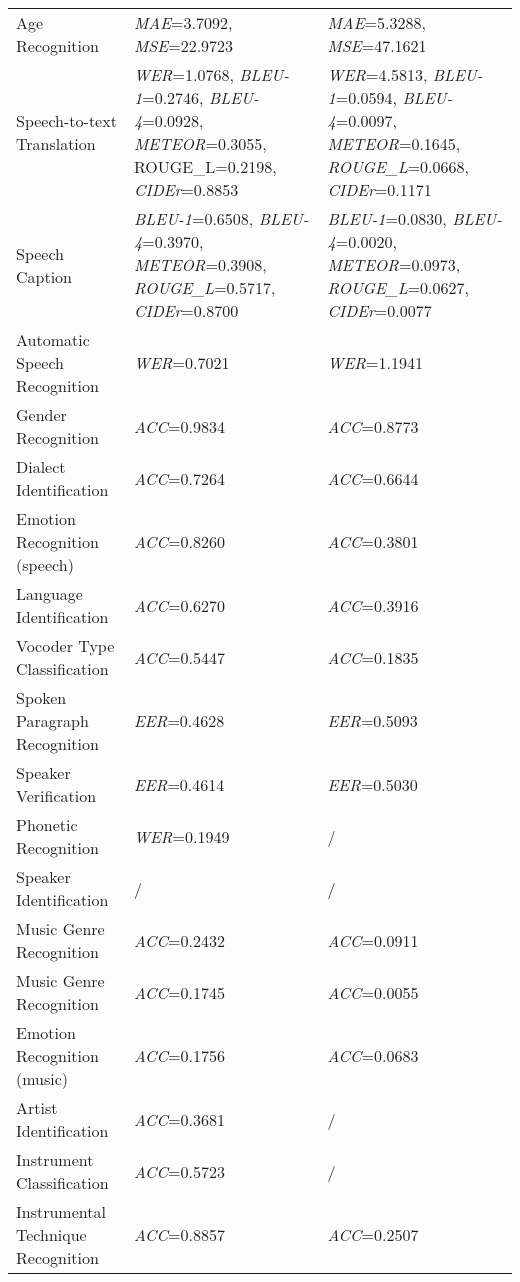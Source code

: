 \begin{longtable}[hbtp]{p{4.6cm}<{\raggedright}p{4.5cm}<{\raggedright}p{4.5cm}<{\raggedright}}
    Age Recognition & \textit{MAE}=3.7092, \textit{MSE}=22.9723 & \textit{MAE}=5.3288, \textit{MSE}=47.1621 \\  %
    Speech-to-text Translation & \textit{WER}=1.0768, \textit{BLEU-1}=0.2746, \textit{BLEU-4}=0.0928, \textit{METEOR}=0.3055, ROUGE\_L=0.2198, \textit{CIDEr}=0.8853 & \textit{WER}=4.5813, \textit{BLEU-1}=0.0594, \textit{BLEU-4}=0.0097, \textit{METEOR}=0.1645, \textit{ROUGE\_L}=0.0668, \textit{CIDEr}=0.1171\\
    Speech Caption & \textit{BLEU-1}=0.6508, \textit{BLEU-4}=0.3970, \textit{METEOR}=0.3908, \textit{ROUGE\_L}=0.5717, \textit{CIDEr}=0.8700 & \textit{BLEU-1}=0.0830, \textit{BLEU-4}=0.0020, \textit{METEOR}=0.0973, \textit{ROUGE\_L}=0.0627, \textit{CIDEr}=0.0077\\
    Automatic Speech Recognition & \textit{WER}=0.7021 & \textit{WER}=1.1941 \\
    Gender Recognition & \textit{ACC}=0.9834 & \textit{ACC}=0.8773\\
    Dialect Identification & \textit{ACC}=0.7264 & \textit{ACC}=0.6644\\
    Emotion Recognition (speech) & \textit{ACC}=0.8260 & \textit{ACC}=0.3801\\
    Language Identification & \textit{ACC}=0.6270 & \textit{ACC}=0.3916\\
    Vocoder Type Classification & \textit{ACC}=0.5447	& \textit{ACC}=0.1835\\
    Spoken Paragraph Recognition & \textit{EER}=0.4628 & \textit{EER}=0.5093 \\
    Speaker Verification & \textit{EER}=0.4614 & \textit{EER}=0.5030 \\
    Phonetic Recognition & \textit{WER}=0.1949 & /\\
    Speaker Identification & / & / \\
    \midrule
    Music Genre Recognition & \textit{ACC}=0.2432 & \textit{ACC}=0.0911\\
    Music Genre Recognition & \textit{ACC}=0.1745 & \textit{ACC}=0.0055\\ %
    Emotion Recognition (music) & \textit{ACC}=0.1756 & \textit{ACC}=0.0683\\
    Artist Identification & \textit{ACC}=0.3681 & /\\
    
    Instrument Classification & \textit{ACC}=0.5723 & / \\ %
    Instrumental Technique Recognition & \textit{ACC}=0.8857 & \textit{ACC}=0.2507\\
    

\end{longtable}
